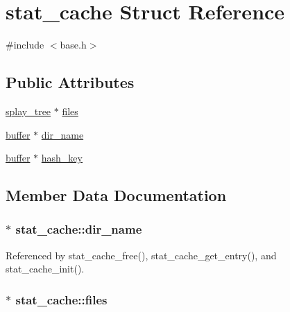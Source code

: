 \hypertarget{structstat__cache}{\section{stat\-\_\-cache Struct Reference}
\label{structstat__cache}
}


{\ttfamily \#include $<$base.\-h$>$}

\subsection*{Public Attributes}
\begin{DoxyCompactItemize}
\item 
\hyperlink{splaytree_8h_ab42fb7db89d33ad5cdd866d99476b0e6}{splay\-\_\-tree} $\ast$ \hyperlink{structstat__cache_aefc9869de4e20fd2e28837184c92e152}{files}
\item 
\hyperlink{structbuffer}{buffer} $\ast$ \hyperlink{structstat__cache_ab6d873d7c775667ee332addfd27f5963}{dir\-\_\-name}
\item 
\hyperlink{structbuffer}{buffer} $\ast$ \hyperlink{structstat__cache_ae46bfe0e7f5cce4c62bd509f7d1c3b4b}{hash\-\_\-key}
\end{DoxyCompactItemize}


\subsection{Member Data Documentation}
\hypertarget{structstat__cache_ab6d873d7c775667ee332addfd27f5963}{
\subsubsection[{dir\-\_\-name}]{$\ast$ stat\-\_\-cache\-::dir\-\_\-name}}\label{structstat__cache_ab6d873d7c775667ee332addfd27f5963}


Referenced by stat\-\_\-cache\-\_\-free(), stat\-\_\-cache\-\_\-get\-\_\-entry(), and stat\-\_\-cache\-\_\-init().

\hypertarget{structstat__cache_aefc9869de4e20fd2e28837184c92e152}{
\subsubsection[{files}]{$\ast$ stat\-\_\-cache\-::files}}\label{structstat__cache_aefc9869de4e20fd2e28837184c92e152}


